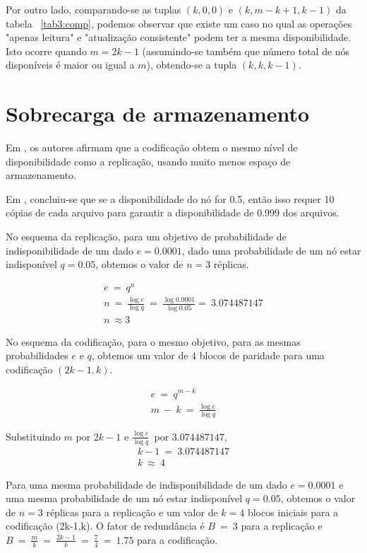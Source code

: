 Por outro lado, comparando-se as tuplas $(k, 0, 0)$ e $(k, m-k+1, k-1)$ da tabela ~\ref{tab3:comp}, podemos observar que existe um caso no qual as operações "apenas leitura" e "atualização consistente" podem ter a mesma disponibilidade. Isto ocorre quando $m = 2k-1$ (assumindo-se também que número total de nós disponíveis é maior ou igual a $m$), obtendo-se a tupla $(k, k, k-1)$.


\section{Sobrecarga de armazenamento}

Em \cite{Weatherspoon:2002:01, Dabek:2004}, os autores afirmam que a codificação obtem o mesmo nível de disponibilidade como a replicação, usando muito menos espaço de armazenamento.

Em \cite{Bhagwan:2004}, concluiu-se que se a disponibilidade do nó for 0.5, então isso requer 10 cópias de cada arquivo para garantir a disponibilidade de 0.999 dos arquivos.

No esquema da replicação, para um objetivo de probabilidade de indisponibilidade de um dado $e = 0.0001$, dado uma probabilidade de um nó estar indisponível $q = 0.05$, obtemos o valor de $n = 3$ réplicas.

$$
\begin{array}{cl}
e\ =\ q^n\\
n\ =\ \frac{\log e}{\log q}\ =\ \frac{\log 0.0001}{\log 0.05} =\ 3.074487147\\
n\ \approx 3
\end{array}
$$

No esquema da codificação, para o mesmo objetivo, para as mesmas probabilidades $e$ e $q$, obtemos um valor de 4 blocos de paridade para uma codificação $(2k-1, k)$.
 
$$
\begin{array}{cl}
e\ =\ q^{m-k}\\
m\ -\ k\ =\ \frac{\log e}{\log q}
\end{array}
$$

Substituindo $m$ por $2k-1$ e $\frac{\log e}{\log q}$\ por $3.074487147$,
$$
\begin{array}{cl}
k-1\ =\ 3.074487147\\
k\ \approx\ 4 
\end{array}
$$

Para uma mesma probabilidade de indisponibilidade de um dado $e = 0.0001$ e uma mesma probabilidade de um nó estar indisponível $q = 0.05$, obtemos o valor de $n = 3$ réplicas para a replicação e um valor de $k=4$ blocos iniciais para a codificação (2k-1,k). O fator de redundância é $B\ =\ 3$ para a replicação e $B\ =\ \frac{m}{k}\ =\ \frac{2k-1}{k}\ =\ \frac{7}{4}\ =\ 1.75$ para a codificação.

